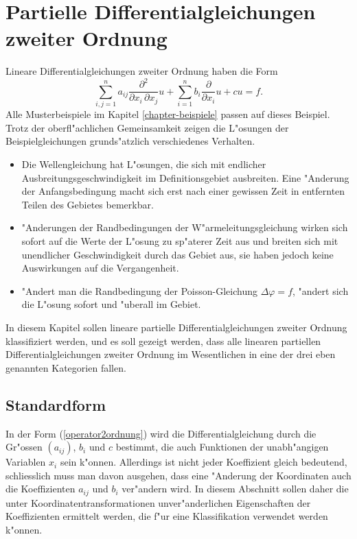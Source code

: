 %
%
%
\chapter{Partielle Differentialgleichungen zweiter Ordnung\label{chapter-2ordnung}}
Lineare Differentialgleichungen zweiter Ordnung haben die Form
\begin{equation}
\sum_{i,j=1}^na_{ij}\frac{\partial^2}{\partial x_i\,\partial x_j} u
+
\sum_{i=1}^nb_i\frac{\partial}{\partial x_i} u+cu=f.
\label{operator2ordnung}
\end{equation}
Alle Musterbeispiele im Kapitel \ref{chapter-beispiele} passen auf dieses 
Beispiel.
Trotz der oberfl"achlichen Gemeinsamkeit zeigen die L"osungen
der Beispielgleichungen grunds"atzlich verschiedenes Verhalten.
\begin{itemize}
\item Die Wellengleichung hat L"osungen, die sich mit endlicher
Ausbreitungsgeschwindigkeit im Definitionsgebiet ausbreiten. Eine "Anderung
der Anfangsbedingung macht sich erst nach einer gewissen Zeit in
entfernten Teilen des Gebietes bemerkbar.
\item "Anderungen der Randbedingungen der W"armeleitungsgleichung wirken
sich sofort auf die Werte der L"osung zu sp"aterer Zeit aus und breiten
sich mit unendlicher Geschwindigkeit durch das Gebiet aus, sie haben jedoch
keine Auswirkungen auf die Vergangenheit.
\item "Andert man die Randbedingung der Poisson-Gleichung $\Delta \varphi=f$,
"andert sich die L"osung sofort und "uberall im Gebiet.
\end{itemize}
In diesem Kapitel sollen lineare partielle Differentialgleichungen zweiter
Ordnung klassifiziert werden, und es soll gezeigt werden, dass alle
linearen partiellen Differentialgleichungen zweiter Ordnung im Wesentlichen
in eine der drei eben genannten Kategorien fallen.

\section{Standardform}
In der Form (\ref{operator2ordnung}) wird die Differentialgleichung durch
die Gr"ossen $(a_{ij})$, $b_i$ und $c$ bestimmt, die auch Funktionen
der unabh"angigen Variablen $x_i$ sein k"onnen.
Allerdings ist nicht jeder Koeffizient gleich bedeutend, schliesslich muss
man davon ausgehen, dass eine "Anderung der Koordinaten auch die Koeffizienten
$a_{ij}$ und $b_i$ ver"andern wird.
In diesem Abschnitt sollen daher die unter Koordinatentransformationen
unver"anderlichen Eigenschaften der Koeffizienten ermittelt werden,
die f"ur eine Klassifikation verwendet werden k"onnen.

